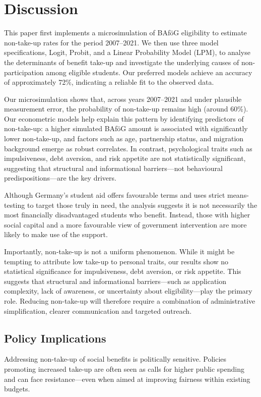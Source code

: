 \section{Discussion}
This paper first implements a microsimulation of BAföG eligibility to estimate non-take-up rates for the period 2007–2021. 
We then use three model specifications, Logit, Probit, and a Linear Probability Model (LPM), to analyse the determinants of benefit take-up and investigate the underlying causes of non-participation among eligible students. 
Our preferred models achieve an accuracy of approximately 72\%, indicating a reliable fit to the observed data.


Our microsimulation shows that, across years 2007–2021 and under plausible measurement error, the probability of non-take-up remains high (around 60\%). 
Our econometric models help explain this pattern by identifying predictors of non-take-up: a higher simulated BAföG amount is associated with significantly lower non-take-up, and factors such as age, partnership status, and migration background emerge as robust correlates. 
In contrast, psychological traits such as impulsiveness, debt aversion, and risk appetite are not statistically significant, suggesting that structural and informational barriers—not behavioural predispositions—are the key drivers.

Although Germany’s student aid offers favourable terms and uses strict means-testing to target those truly in need, the analysis suggests it is not necessarily the most financially disadvantaged students who benefit. 
Instead, those with higher social capital and a more favourable view of government intervention are more likely to make use of the support.

Importantly, non-take-up is not a uniform phenomenon. 
While it might be tempting to attribute low take-up to personal traits, our results show no statistical significance for impulsiveness, debt aversion, or risk appetite. 
This suggests that structural and informational barriers—such as application complexity, lack of awareness, or uncertainty about eligibility—play the primary role. 
Reducing non-take-up will therefore require a combination of administrative simplification, clearer communication and targeted outreach.

\subsection{Policy Implications}

Addressing non-take-up of social benefits is politically sensitive. Policies promoting increased take-up are often seen as calls for higher public spending and can face resistance—even when aimed at improving fairness within existing budgets.

